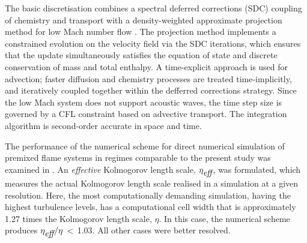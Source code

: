 The basic discretisation combines a spectral deferred corrections (SDC) coupling
of chemistry and transport \cite{Nonaka2012} with a density-weighted approximate
projection method for low Mach number flow \cite{DayBell2000}.  The projection method
implements a constrained evolution on the velocity field via the SDC iterations,
which ensures that the update simultaneously satisfies the 
equation of state and discrete conservation of mass and total enthalpy.
A time-explicit approach is used for advection; faster diffusion
and chemistry processes are treated time-implicitly, and iteratively
coupled together within the defferred corrections strategy.
Since the low Mach system does not support acoustic waves,
the time step size is governed by a CFL constraint based on advective transport.
The integration algorithm is second-order accurate in space
and time.

The performance of the numerical scheme for direct numerical 
simulation of premixed flame systems in regimes comparable to the present study
was examined in \cite{Aspden08b}.  An {\em effective} Kolmogorov
length scale, $\eta_{\mbox{\it eff}}$, was formulated, which measures the actual Kolmogorov length
scale realised in a simulation at a given resolution.
Here, the most computationally demanding simulation, having the highest turbulence levels,
has a computational cell width that is approximately 1.27 times the
Kolmogorov length scale, $\eta$.  In this case, the numerical scheme produces
$\eta_{\mbox{\it eff}}/\eta\,$$<\,$1.03.  All other cases were better resolved.
